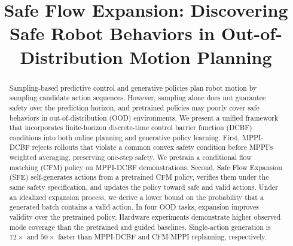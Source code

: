 \documentclass[letterpaper, 10 pt, conference]{ieeeconf}
\title{\LARGE \bf
Safe Flow Expansion: Discovering Safe Robot Behaviors in Out-of-Distribution Motion Planning
}
\begin{document}
\maketitle
\thispagestyle{empty}
\pagestyle{empty}
\begin{abstract}
Sampling-based predictive control and generative policies plan robot motion by sampling candidate action sequences. However, sampling alone does not guarantee safety over the prediction horizon, and pretrained policies may poorly cover safe behaviors in out-of-distribution (OOD) environments. 
We present a unified framework that incorporates finite-horizon discrete-time control barrier function (DCBF) conditions into both online planning and generative policy learning. 
First, MPPI-DCBF rejects rollouts that violate a common convex safety condition before MPPI's weighted averaging, preserving one-step safety. We pretrain a conditional flow matching (CFM) policy on MPPI-DCBF demonstrations.
Second, Safe Flow Expansion (SFE) self-generates actions from a pretrained CFM policy, verifies them under the same safety specification, and updates the policy toward safe and valid actions.
Under an idealized expansion process, we derive a lower bound on the probability that a generated batch contains a valid action.
In four OOD tasks, expansion improves validity over the pretrained policy. Hardware experiments demonstrate higher observed mode coverage than the pretrained and guided baselines. Single-action generation is $\mathrm{12\times}$ and $\mathrm{50\times}$ faster than MPPI-DCBF and CFM-MPPI replanning, respectively.
\end{abstract}
\end{document}
